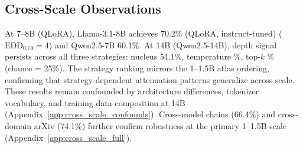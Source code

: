 

\subsection{Cross-Scale Observations}
\label{sec:gen:crossscale}

At 7--8B (QLoRA), Llama-3.1-8B \cite{llama3} achieves 70.2\% (QLoRA, instruct-tuned) ($\mathrm{EDD}_{0.70}{=}4$) and Qwen2.5-7B \cite{qwen2.5} 60.1\%.
At 14B (Qwen2.5-14B), depth signal persists across all three strategies: nucleus 54.1\%, temperature \TEMPACCURACY{}\%, top-$k$ \TOPKACCURACY{}\% (chance = 25\%).
The strategy ranking %
mirrors the 1--1.5B atlas ordering, confirming that strategy-dependent attenuation patterns generalize across scale.
These results remain confounded by architecture differences, tokenizer vocabulary, and training data composition at 14B (Appendix~\ref{app:cross_scale_confounds}).
Cross-model chains (66.4\%) and cross-domain arXiv (74.1\%) further confirm robustness at the primary 1--1.5B scale (Appendix~\ref{app:cross_scale_full}).





